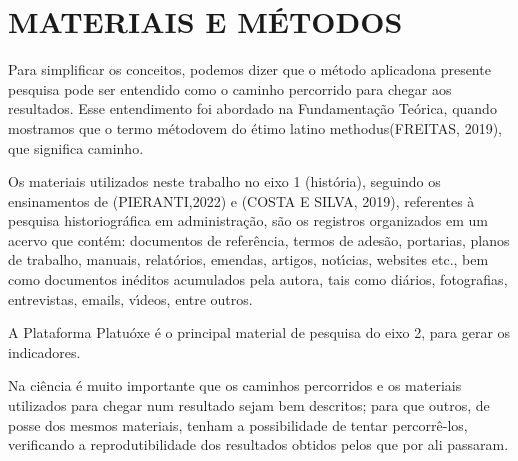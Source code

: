 \documentclass[
12pt,		%
openright,	%
twoside,  %
a4paper,			%
chapter=TITLE,		%
english,			%
french,				%
spanish,			%
brazil				%
]{USPSC-classe/USPSC}
\begin{document}
\chapter[MATERIAIS E M\'ETODOS]{MATERIAIS E M\'ETODOS}\label{MATERIAIS E M\'ETODOS}
Para simplificar os conceitos, podemos dizer que o \textquotedbl m\'etodo aplicado\textquotedbl  na presente pesquisa pode ser entendido como o \textquotedbl caminho percorrido \textquotedbl  para chegar aos resultados. Esse entendimento  foi abordado  na Fundamenta\c{c}\~ao Te\'orica, quando mostramos que o termo \textquotedbl m\'etodo\textquotedbl  vem do \'etimo latino \textquotedbl methodus\textquotedbl  (FREITAS, 2019), que significa \textquotedbl caminho\textquotedbl .

















Os materiais utilizados neste trabalho no eixo 1 (hist\'oria), seguindo os ensinamentos de (PIERANTI,2022) e (COSTA E SILVA, 2019), referentes \`a pesquisa historiogr\'afica em administra\c{c}\~ao,  s\~ao os registros organizados em um acervo que cont\'em: documentos de refer\^encia, termos de ades\~ao, portarias, planos de trabalho, manuais, relat\'orios, emendas, artigos, not\'{\i}cias, websites etc., bem como documentos in\'editos acumulados pela autora, tais como di\'arios, fotografias, entrevistas, emails, v\'{\i}deos, entre outros.

















A Plataforma Platu\'oxe \'e o principal material de pesquisa do eixo 2, para gerar os indicadores.

















Na ci\^encia \'e muito importante que os caminhos percorridos e os materiais utilizados para chegar num resultado sejam bem descritos; para que outros, de posse dos mesmos materiais, tenham a possibilidade de tentar percorr\^e-los, verificando a reprodutibilidade dos resultados obtidos pelos que por ali passaram.
\end{document}
